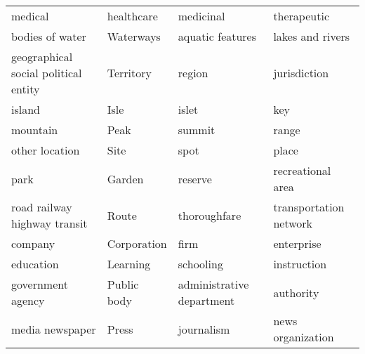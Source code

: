 \documentclass[11pt]{article}
\begin{document}
\begin{table*}[htb]
\begin{center}
{\begin{tabular}{llll}
    medical                                          & healthcare                             & medicinal                              & therapeutic                            \\
bodies of water                                  & Waterways                              & aquatic features                       & lakes and rivers                       \\
    geographical social political entity             & Territory                              & region                                 & jurisdiction                           \\
    island                                           & Isle                                   & islet                                  & key                                    \\
    mountain                                         & Peak                                   & summit                                 & range                                  \\
    other location                                   & Site                                   & spot                                   & place                                  \\
    park                                             & Garden                                 & reserve                                & recreational area                      \\
    road railway highway transit                     & Route                                  & thoroughfare                           & transportation network                 \\
    company                                          & Corporation                            & firm                                   & enterprise                             \\
    education                                        & Learning                               & schooling                              & instruction                            \\
    government agency                                & Public body                            & administrative department              & authority                              \\
    media newspaper                                  & Press                                  & journalism                             & news organization                      \\

\end{tabular}}
\end{center}
\end{table*}
\end{document}
